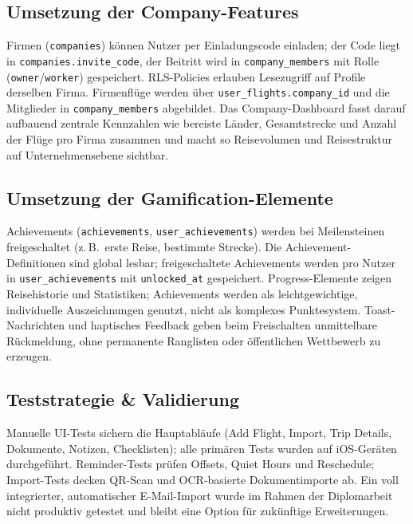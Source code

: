 \subsection{Umsetzung der Company-Features}
Firmen (\texttt{companies}) können Nutzer per Einladungscode einladen; der Code
liegt in \texttt{companies.invite\_code}, der Beitritt wird in
\texttt{company\_members} mit Rolle (\texttt{owner}/\texttt{worker}) gespeichert.
RLS-Policies erlauben Lesezugriff auf Profile derselben Firma. Firmenflüge werden
über \texttt{user\_flights.company\_id} und die Mitglieder in
\texttt{company\_members} abgebildet. Das Company-Dashboard fasst darauf aufbauend
zentrale Kennzahlen wie bereiste Länder, Gesamtstrecke und Anzahl der Flüge pro Firma
zusammen und macht so Reisevolumen und Reisestruktur auf Unternehmensebene sichtbar.

\subsection{Umsetzung der Gamification-Elemente}
Achievements (\texttt{achievements}, \texttt{user\_achievements}) werden bei
Meilensteinen freigeschaltet (z.\,B.\ erste Reise, bestimmte Strecke). Die
Achievement-Definitionen sind global lesbar; freigeschaltete Achievements werden
pro Nutzer in \texttt{user\_achievements} mit \texttt{unlocked\_at} gespeichert.
Progress-Elemente zeigen Reisehistorie und Statistiken; Achievements werden als
leichtgewichtige, individuelle Auszeichnungen genutzt, nicht als komplexes Punktesystem.
Toast-Nachrichten und haptisches Feedback geben beim Freischalten unmittelbare Rückmeldung,
ohne permanente Ranglisten oder öffentlichen Wettbewerb zu erzeugen.

\subsection{Teststrategie \& Validierung}
Manuelle UI-Tests sichern die Hauptabläufe (Add Flight, Import, Trip Details,
Dokumente, Notizen, Checklisten); alle primären Tests wurden auf iOS-Geräten
durchgeführt. Reminder-Tests prüfen Offsets, Quiet Hours und Reschedule;
Import-Tests decken QR-Scan und OCR-basierte Dokumentimporte ab. Ein voll
integrierter, automatischer E-Mail-Import wurde im Rahmen der Diplomarbeit
nicht produktiv getestet und bleibt eine Option für zukünftige Erweiterungen.
